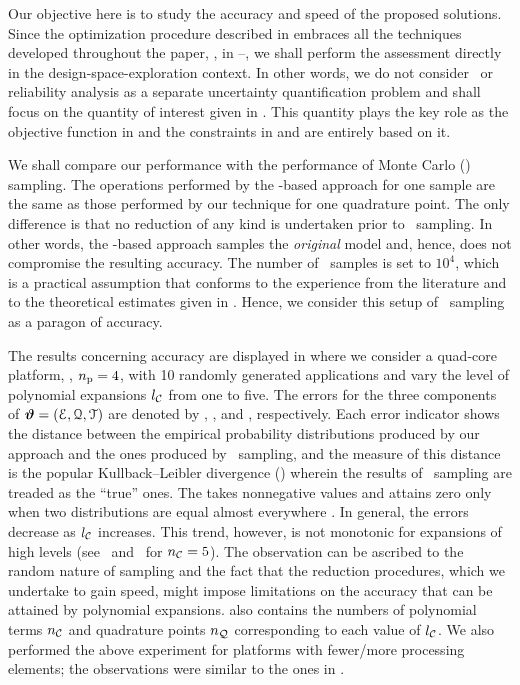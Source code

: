 Our objective here is to study the accuracy and speed of the proposed solutions.
Since the optimization procedure described in  embraces all the techniques developed throughout the paper, \ie, in --, we shall perform the assessment directly in the design-space-exploration context.
In other words, we do not consider \ta\ or reliability analysis as a separate uncertainty quantification problem and shall focus on the quantity of interest given in .
This quantity plays the key role as the objective function in  and the constraints in  and  are entirely based on it.

We shall compare our performance with the performance of Monte Carlo (\MC) sampling.
The operations performed by the \MC-based approach for one sample are the same as those performed by our technique for one quadrature point.
The only difference is that no reduction of any kind is undertaken prior to \MC\ sampling.
In other words, the \MC-based approach samples the \emph{original} model and, hence, does not compromise the resulting accuracy.
The number of \MC\ samples is set to $10^4$, which is a practical assumption that conforms to the experience from the literature \cite{ukhov2014, lee2013, juan2012, xiang2010} and to the theoretical estimates given in \cite{diaz-emparanza2002}.
Hence, we consider this setup of \MC\ sampling as a paragon of accuracy.


The results concerning accuracy are displayed in  where we consider a quad-core platform, \ie, ${n_\text{p}} = 4$, with 10 randomly generated applications and vary the level of polynomial expansions ${l_\mathcal{C}}$ from one to five.
The errors for the three components of $\bm{\vartheta} = (\EuScript{E}, \EuScript{Q}, \EuScript{T})$ are denoted by \errorE, \errorQ, and \errorT, respectively.
Each error indicator shows the distance between the empirical probability distributions produced by our approach and the ones produced by \MC\ sampling, and the measure of this distance is the popular Kullback--Leibler divergence () wherein the results of \MC\ sampling are treaded as the ``true'' ones.
The  takes nonnegative values and attains zero only when two distributions are equal almost everywhere \cite{durrett2010}.
In general, the errors decrease as ${l_\mathcal{C}}$ increases.
This trend, however, is not monotonic for expansions of high levels (see \errorQ\ and \errorT\ for ${n_\mathcal{C}} = 5$).
The observation can be ascribed to the random nature of sampling and the fact that the reduction procedures, which we undertake to gain speed, might impose limitations on the accuracy that can be attained by polynomial expansions.
 also contains the numbers of polynomial terms ${n_\mathcal{C}}$ and quadrature points ${n_\mathcal{Q}}$ corresponding to each value of ${l_\mathcal{C}}$.
We also performed the above experiment for platforms with fewer/more processing elements; the observations were similar to the ones in .

